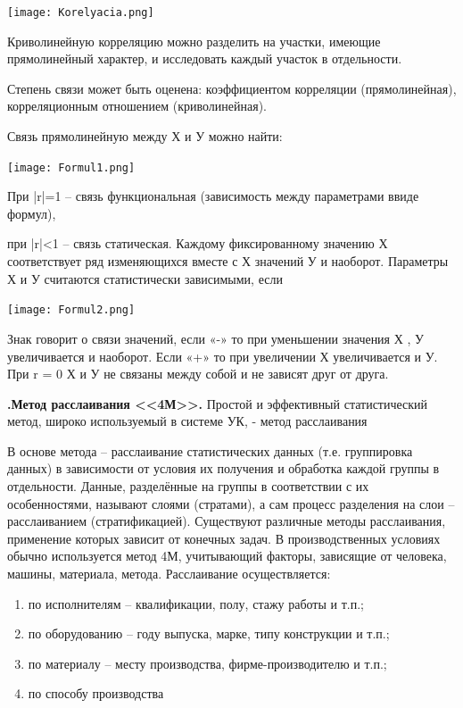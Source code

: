 \documentclass[unicode, 12pt, a4paper, oneside]{article}
\newcounter{qcnt}
\newcommand{\quest}[1]{\par\refstepcounter{qcnt}\textbf{\arabic{qcnt}.\quad #1}}
\begin{document}
 \begin{center} 
 \texttt{[image: Korelyacia.png]}\\
 \end{center}
 
 Криволинейную корреляцию можно разделить на участки, имеющие прямолинейный характер, и исследовать каждый участок в отдельности.
 
 Степень связи может быть оценена: коэффициентом корреляции (прямолинейная), корреляционным отношением (криволинейная).
 
 Связь прямолинейную между Х и У можно найти:
 
 \begin{center} 
  \texttt{[image: Formul1.png]}\\
  \end{center}
 При |r|=1 – связь функциональная (зависимость между параметрами ввиде формул),
 
при |r|<1 – связь статическая. Каждому фиксированному значению Х соответствует ряд изменяющихся вместе с Х значений У и наоборот. Параметры Х и У считаются статистически зависимыми, если
\begin{center} 
  \texttt{[image: Formul2.png]}\\
  \end{center}
  
Знак говорит о связи значений, если «-» то при уменьшении значения Х , У увеличивается и наоборот. Если «+» то при увеличении Х увеличивается и У.
  При r = 0 Х и У не связаны  между собой и не зависят друг от друга.
  
\quest{Метод расслаивания <<4М>>.}
Простой и эффективный статистический метод, широко используемый в системе УК, - метод расслаивания

В основе метода – расслаивание статистических данных (т.е. группировка данных) в зависимости от условия их получения и обработка каждой группы в отдельности. Данные, разделённые на группы в соответствии с их особенностями, называют слоями (стратами), а сам процесс разделения на слои – расслаиванием (стратификацией). Существуют различные методы расслаивания, применение которых зависит от конечных задач. В производственных условиях обычно используется метод 4М, учитывающий факторы, зависящие от человека, машины, материала, метода. Расслаивание осуществляется:
\begin{enumerate}
\item по исполнителям – квалификации, полу, стажу работы и т.п.;
	\item по оборудованию – году выпуска, марке, типу конструкции  и т.п.;
	\item по материалу – месту производства, фирме-производителю и т.п.;
	\item по способу производства 

\end{enumerate}
\end{document}
